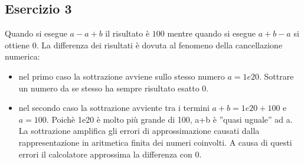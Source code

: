\subsection{Esercizio 3}
Quando si esegue $a-a+b$ il risultato è $100$ mentre quando si esegue $a+b-a$ si ottiene $0$. La differenza dei risultati è dovuta al fenomeno della cancellazione
numerica:
\begin{itemize}
    \item nel primo caso la sottrazione avviene sullo stesso numero $a=1e20$. Sottrare un numero da se stesso ha sempre risultato esatto $0$.
    \item nel secondo caso la sottrazione avviente tra i termini $a+b = 1e20 + 100$ e $a = 100$. Poichè 1e20 è molto più grande di 100, a+b è ''quasi uguale'' ad a.
La sottrazione amplifica gli errori di approssimazione causati dalla rappresentazione in aritmetica finita dei numeri coinvolti. A causa di questi errori il calcolatore approssima la differenza con $0$.
\end{itemize}